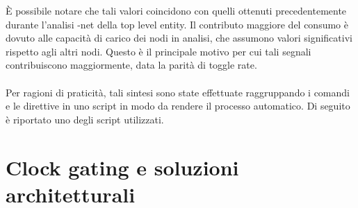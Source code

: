 \documentclass[11pt,  english, makeidx, a4paper, titlepage, oneside]{book}
\newenvironment{listato}{\footnotesize} {\normalsize }
\begin{document}
\vspace{0.3cm}
È possibile notare che tali valori coincidono con quelli ottenuti precedentemente durante l'analisi -net della top level entity. Il contributo maggiore del consumo è dovuto alle capacità di carico dei nodi in analisi, che assumono  valori significativi rispetto agli altri nodi. Questo è il principale motivo per cui tali segnali contribuiscono maggiormente, data la parità di toggle rate.
\\\\
Per ragioni di praticità, tali sintesi sono state effettuate raggruppando i comandi e le direttive in uno script in modo da rendere il processo automatico. Di seguito è riportato uno degli script utilizzati.
\begin{center}
\begin{listato}
	\centerline{}
\end{listato}
\end{center}

\chapter{Clock gating e soluzioni architetturali}
\end{document}

